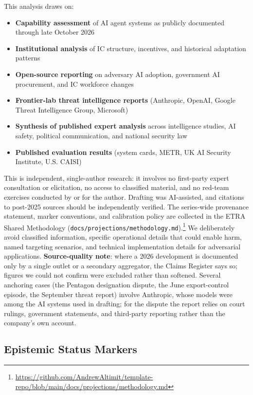 \documentclass[11pt,letterpaper]{article}
\begin{document}
This analysis draws on:
\begin{itemize}[nosep]
  \item \textbf{Capability assessment} of AI agent systems as publicly documented through late October 2026
  \item \textbf{Institutional analysis} of IC structure, incentives, and historical adaptation patterns
  \item \textbf{Open-source reporting} on adversary AI adoption, government AI procurement, and IC workforce changes
  \item \textbf{Frontier-lab threat intelligence reports} (Anthropic, OpenAI, Google Threat Intelligence Group, Microsoft)
  \item \textbf{Synthesis of published expert analysis} across intelligence studies, AI safety, political communication, and national security law
  \item \textbf{Published evaluation results} (system cards, METR, UK AI Security Institute, U.S. CAISI)
\end{itemize}

This is independent, single-author research: it involves no first-party expert consultation or elicitation, no access to classified material, and no red-team exercises conducted by or for the author. Drafting was AI-assisted, and citations to post-2025 sources should be independently verified. The series-wide provenance statement, marker conventions, and calibration policy are collected in the ETRA Shared Methodology (\texttt{docs/projections/methodology.md}).\footnote{\url{https://github.com/AndrewAltimit/template-repo/blob/main/docs/projections/methodology.md}} We deliberately avoid classified information, specific operational details that could enable harm, named targeting scenarios, and technical implementation details for adversarial applications. \textbf{Source-quality note}: where a 2026 development is documented only by a single outlet or a secondary aggregator, the Claims Register says so; figures we could not confirm were excluded rather than softened. Several anchoring cases (the Pentagon designation dispute, the June export-control episode, the September threat report) involve Anthropic, whose models were among the AI systems used in drafting; for the dispute the report relies on court rulings, government statements, and third-party reporting rather than the company's own account.

\subsection{Epistemic Status Markers}
\end{document}
